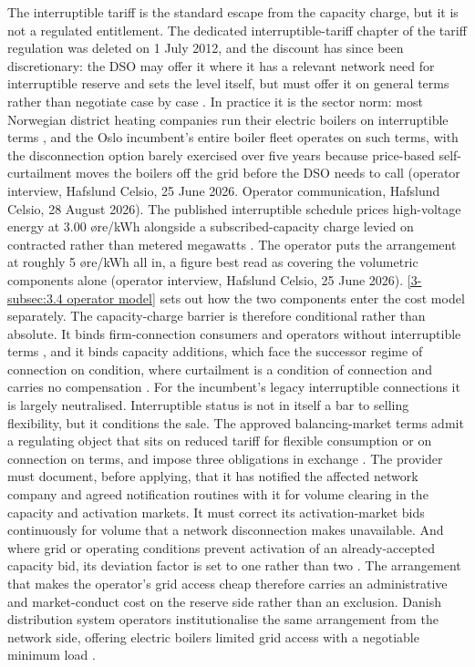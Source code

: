 \newpage
The interruptible tariff is the standard escape from the capacity charge, but it is not a regulated entitlement. The dedicated interruptible-tariff chapter of the tariff regulation was deleted on 1 July 2012, and the discount has since been discretionary: the DSO may offer it where it has a relevant network need for interruptible reserve and sets the level itself, but must offer it on general terms rather than negotiate case by case \cite{rme_nettleie_2025, ove_flataker_national_2020}. In practice it is the sector norm: most Norwegian district heating companies run their electric boilers on interruptible terms \cite{norsk_fjernvarme_fakta_nodate, norsk_fjernvarme_fjernkontrollenno_nodate}, and the Oslo incumbent's entire boiler fleet operates on such terms, with the disconnection option barely exercised over five years because price-based self-curtailment moves the boilers off the grid before the DSO needs to call (operator interview, Hafslund Celsio, 25 June 2026. Operator communication, Hafslund Celsio, 28 August 2026). The published interruptible schedule prices high-voltage energy at 3.00 øre/kWh alongside a subscribed-capacity charge levied on contracted rather than metered megawatts \cite{elvia_dagens_2022}. The operator puts the arrangement at roughly 5 øre/kWh all in, a figure best read as covering the volumetric components alone (operator interview, Hafslund Celsio, 25 June 2026). \autoref{3-subsec:3.4 operator model} sets out how the two components enter the cost model separately. The capacity-charge barrier is therefore conditional rather than absolute. It binds firm-connection consumers and operators without interruptible terms \cite{sneum_economic_2018}, and it binds capacity additions, which face the successor regime of connection on condition, where curtailment is a condition of connection and carries no compensation \cite{energidepartementet_forskrift_2019}. For the incumbent's legacy interruptible connections it is largely neutralised. Interruptible status is not in itself a bar to selling flexibility, but it conditions the sale. The approved balancing-market terms admit a regulating object that sits on reduced tariff for flexible consumption or on connection on terms, and impose three obligations in exchange \cite{statnett_forslag_2025}. The provider must document, before applying, that it has notified the affected network company and agreed notification routines with it for volume clearing in the capacity and activation markets. It must correct its activation-market bids continuously for volume that a network disconnection makes unavailable. And where grid or operating conditions prevent activation of an already-accepted capacity bid, its deviation factor is set to one rather than two \cite{statnett_forslag_2025}. The arrangement that makes the operator's grid access cheap therefore carries an administrative and market-conduct cost on the reserve side rather than an exclusion. Danish distribution system operators institutionalise the same arrangement from the network side, offering electric boilers limited grid access with a negotiable minimum load \cite{danish_energy_agency_technology_2024}.

